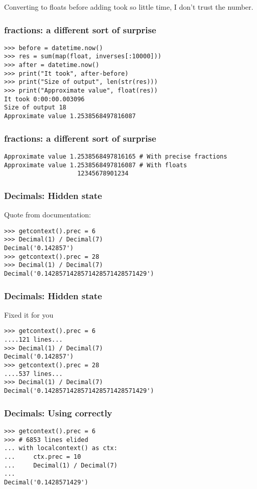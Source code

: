Converting to floats before adding took so little time,
I don't trust the number.

\begin{frame}[fragile]
\frametitle{fractions: a different sort of surprise}

\begin{lstlisting}
>>> before = datetime.now()
>>> res = sum(map(float, inverses[:10000]))
>>> after = datetime.now()
>>> print("It took", after-before)
>>> print("Size of output", len(str(res)))
>>> print("Approximate value", float(res))
It took 0:00:00.003096
Size of output 18
Approximate value 1.2538568497816087
\end{lstlisting}
\end{frame}

\begin{frame}[fragile]
\frametitle{fractions: a different sort of surprise}

\begin{lstlisting}
Approximate value 1.2538568497816165 # With precise fractions
Approximate value 1.2538568497816087 # With floats
                    12345678901234
\end{lstlisting}
\end{frame}

\begin{frame}[fragile]
\frametitle{Decimals: Hidden state}

Quote from documentation:

\begin{lstlisting}
>>> getcontext().prec = 6
>>> Decimal(1) / Decimal(7)
Decimal('0.142857')
>>> getcontext().prec = 28
>>> Decimal(1) / Decimal(7)
Decimal('0.1428571428571428571428571429')
\end{lstlisting}

\end{frame}

\begin{frame}[fragile]
\frametitle{Decimals: Hidden state}

Fixed it for you

\begin{lstlisting}
>>> getcontext().prec = 6
....121 lines...
>>> Decimal(1) / Decimal(7)
Decimal('0.142857')
>>> getcontext().prec = 28
....537 lines...
>>> Decimal(1) / Decimal(7)
Decimal('0.1428571428571428571428571429')
\end{lstlisting}

\end{frame}

\begin{frame}[fragile]
\frametitle{Decimals: Using correctly}

\begin{lstlisting}
>>> getcontext().prec = 6
>>> # 6853 lines elided
... with localcontext() as ctx:
...     ctx.prec = 10
...     Decimal(1) / Decimal(7)
... 
Decimal('0.1428571429')
\end{lstlisting}

\end{frame}



